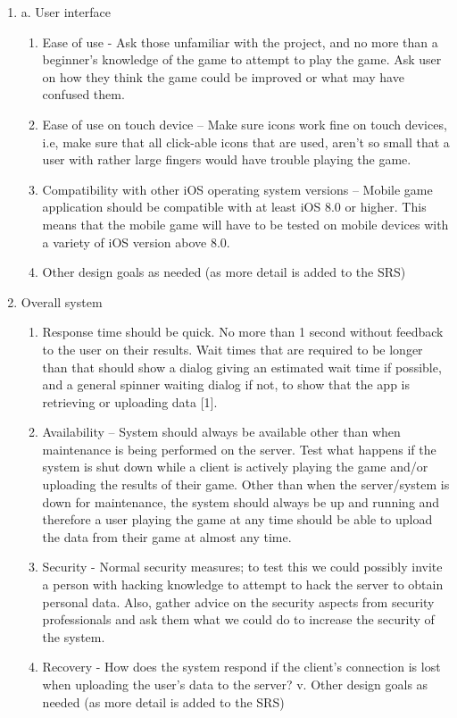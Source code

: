 \documentclass[a4wide]{article}
\begin{document}
\begin{enumerate}
\begin{enumerate}
\item a.	User interface
\begin{enumerate}
\item	Ease of use - Ask those unfamiliar with the project, and no more than a beginner’s knowledge of the game to attempt to play the game. Ask user on how they think the game could be improved or what may have confused them.
\item	Ease of use on touch device – Make sure icons work fine on touch devices, i.e, make sure that all click-able icons that are used, aren't so small that a user with rather large fingers would have trouble playing the game.
\item	Compatibility with other iOS operating system versions – Mobile game application should be compatible with at least iOS 8.0 or higher. This means that the mobile game will have to be tested on mobile devices with a variety of iOS version above 8.0.
\item 	Other design goals as needed (as more detail is added to the SRS)
\end{enumerate}
\item	Overall system
\begin{enumerate}
\item	 Response time should be quick. No more than 1 second without feedback to the user on their results. Wait times that are required to be longer than that should show a dialog giving an estimated wait time if possible, and a general spinner waiting dialog if not, to show that the app is retrieving or uploading data [1].
\item	Availability – System should always be available other than when maintenance is being performed on the server. Test what happens if the system is shut down while a client is actively playing the game and/or uploading the results of their game. Other than when the server/system is down for maintenance, the system should always be up and running and therefore a user playing the game at any time should be able to upload the data from their game at almost any time.
\item	Security - Normal security measures; to test this we could possibly invite a person with hacking knowledge to attempt to hack the server to obtain personal data. Also, gather advice on the security aspects from security professionals  and ask them what we could do to increase the security of the system.
\item	Recovery - How does the system respond if the client’s connection is lost when uploading the user’s data to the server?
v.	Other design goals as needed (as more detail is added to the SRS)
\end{enumerate}


\end{enumerate}
\end{enumerate}
\end{document}
